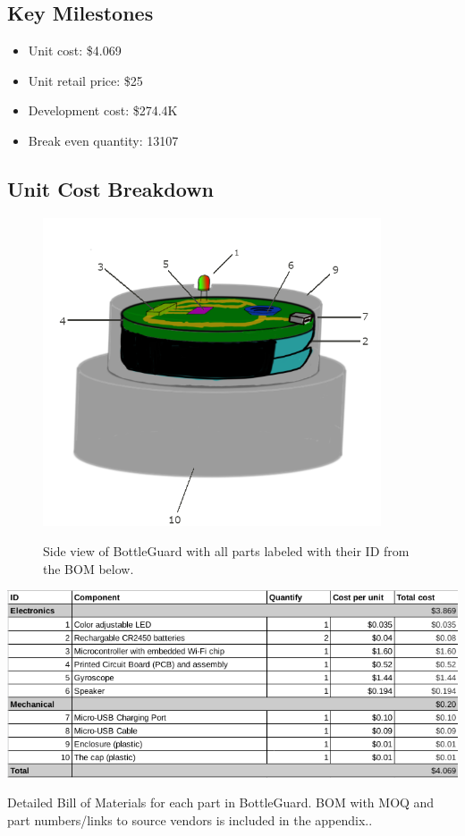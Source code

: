 \documentclass[12pt]{article}
\begin{document}
	\subsection*{Key Milestones}
	\begin{itemize}
		\item 	Unit cost: \$4.069
		\item Unit retail price: \$25
		\item Development cost: \$274.4K
		\item Break even quantity: 13107
	\end{itemize}

	
	\subsection*{Unit Cost Breakdown}
		\begin{figure}[H]
		\centering
		\includegraphics[width=10cm ]{DesignLabeled.png}
		\label{fig:design}
		\caption{Side view of BottleGuard with all parts labeled with their ID from the BOM below.}
	\end{figure}
\begin{table}[H]
	\includegraphics[width=\textwidth]{bom_small.png}
	\label{fig:bom}
	\caption{Detailed Bill of Materials for each part in BottleGuard. BOM with MOQ and part numbers/links to source vendors is included in the appendix..}
\end{table}
\end{document}
